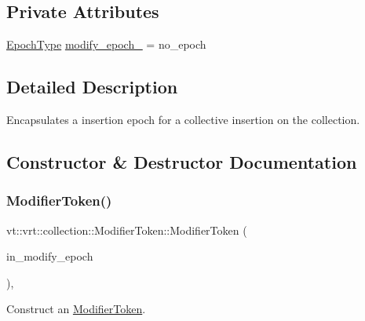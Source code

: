 \subsection*{Private Attributes}
\begin{DoxyCompactItemize}
\item 
\hyperlink{namespacevt_a81d11b28122d43bf9834577e4a06440f}{Epoch\+Type} \hyperlink{structvt_1_1vrt_1_1collection_1_1_modifier_token_a3c0115cdf4a5097aa9ff940b0e8c9172}{modify\+\_\+epoch\+\_\+} = no\+\_\+epoch
\end{DoxyCompactItemize}


\subsection{Detailed Description}
Encapsulates a insertion epoch for a collective insertion on the collection. 

\subsection{Constructor \& Destructor Documentation}
\mbox{\label{structvt_1_1vrt_1_1collection_1_1_modifier_token_a6c0d5fed4a1575396c0e2f6656cffd75}} 
\subsubsection{\texorpdfstring{Modifier\+Token()}{ModifierToken()}\hspace{0.1cm}{\footnotesize\ttfamily [1/3]}}
{\footnotesize\ttfamily vt\+::vrt\+::collection\+::\+Modifier\+Token\+::\+Modifier\+Token (\begin{DoxyParamCaption}\item[{\hyperlink{namespacevt_a81d11b28122d43bf9834577e4a06440f}{Epoch\+Type}}]{in\+\_\+modify\+\_\+epoch }\end{DoxyParamCaption})\hspace{0.3cm}{\ttfamily [inline]}, {\ttfamily [explicit]}}



Construct an {\ttfamily \hyperlink{structvt_1_1vrt_1_1collection_1_1_modifier_token}{Modifier\+Token}}. 


